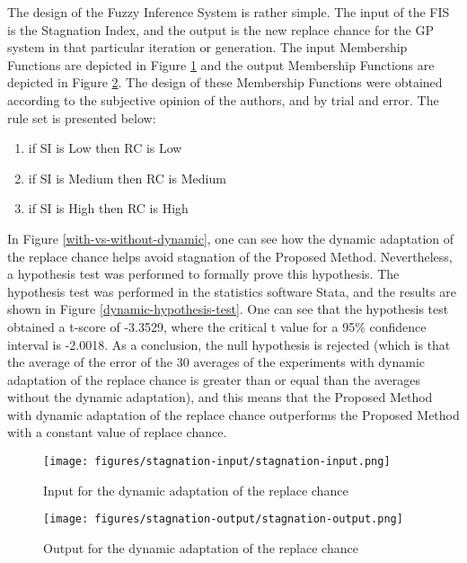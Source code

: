 \documentclass[12pt,journal,draftcls,onecolumn]{IEEEtran}
\begin{document}
The design of the Fuzzy Inference System is rather simple. The input of the FIS is the Stagnation Index, and the output is the new replace chance for the GP system in that particular iteration or generation. The input Membership Functions are depicted in Figure \ref{dynamic-adaptation-input} and the output Membership Functions are depicted in Figure \ref{dynamic-adaptation-output}. The design of these Membership Functions were obtained according to the subjective opinion of the authors, and by trial and error. The rule set is presented below:

\begin{enumerate}
\item if SI is Low then RC is Low
\item if SI is Medium then RC is Medium
\item if SI is High then RC is High
\end{enumerate}

In Figure \ref{with-vs-without-dynamic}, one can see how the dynamic
adaptation of the replace chance helps avoid stagnation of the
Proposed Method. Nevertheless, a hypothesis test was performed to
formally prove this hypothesis. The hypothesis test was performed in
the statistics software Stata, and the results are shown in Figure
\ref{dynamic-hypothesis-test}. One can see that the hypothesis test
obtained a t-score of -3.3529, where the critical t value for a 95\%
confidence interval is -2.0018. As a conclusion, the null hypothesis
is rejected (which is that the average of the error of the 30 averages
of the experiments with dynamic adaptation of the replace chance is
greater than or equal than the averages without the dynamic
adaptation), and this means that the Proposed Method with dynamic
adaptation of the replace chance outperforms the Proposed Method with
a constant value of replace chance.

\begin{figure}[htp]
\caption{Input for the dynamic adaptation of the replace chance}
\label{dynamic-adaptation-input}
\begin{center}
\texttt{[image: figures/stagnation-input/stagnation-input.png]}
\end{center}
\end{figure}

\begin{figure}[htp]
\caption{Output for the dynamic adaptation of the replace chance}
\label{dynamic-adaptation-output}
\begin{center}
\texttt{[image: figures/stagnation-output/stagnation-output.png]}
\end{center}
\end{figure}
\end{document}
